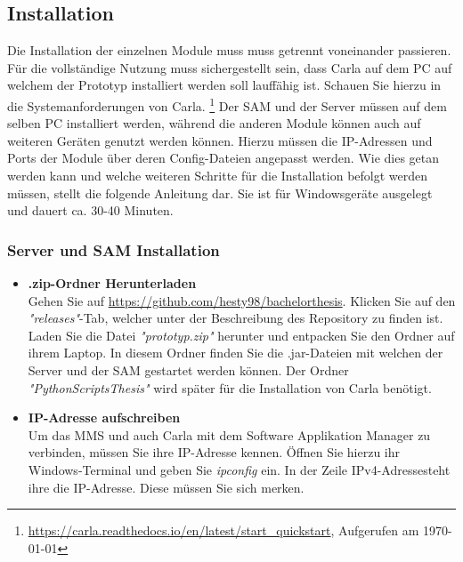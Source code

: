 \subsection{Installation}
Die Installation der einzelnen Module muss muss getrennt voneinander passieren. Für die vollständige Nutzung muss sichergestellt sein, dass Carla auf dem PC auf welchem der Prototyp installiert werden soll lauffähig ist. Schauen Sie hierzu in die Systemanforderungen von Carla.  \footnote{\url{https://carla.readthedocs.io/en/latest/start_quickstart}, Aufgerufen am \today} Der SAM und der Server müssen auf dem selben PC installiert werden, während die anderen Module können auch auf weiteren Geräten genutzt werden können. Hierzu müssen die IP-Adressen und Ports der Module über deren Config-Dateien angepasst werden. Wie dies getan werden kann und welche weiteren Schritte für die Installation befolgt werden müssen, stellt die folgende Anleitung dar. Sie ist für Windowsgeräte ausgelegt und dauert ca. 30-40 Minuten.


\subsubsection{Server und SAM Installation}
\begin{itemize}
	\item[\textbf{1.}] \textbf{.zip-Ordner Herunterladen}\\
	Gehen Sie auf \url{https://github.com/hesty98/bachelorthesis}. Klicken Sie auf den \textit{"releases"}-Tab, welcher unter der Beschreibung des Repository zu finden ist.
	Laden Sie die Datei \textit{"prototyp.zip"} herunter und entpacken Sie den Ordner auf ihrem Laptop. In diesem Ordner finden Sie die .jar-Dateien mit welchen der Server und der SAM gestartet werden können. Der Ordner \textit{"PythonScriptsThesis"} wird später für die Installation von Carla benötigt.
	
	\item[\textbf{2.}] \textbf{IP-Adresse aufschreiben}\\
	Um das MMS und auch Carla mit dem Software Applikation Manager zu verbinden, müssen Sie ihre IP-Adresse kennen. Öffnen Sie hierzu ihr Windows-Terminal und geben Sie \textit{ipconfig} ein. In der Zeile \glqq IPv4-Adresse\grqq steht ihre die IP-Adresse. Diese müssen Sie sich merken.
\end{itemize}


